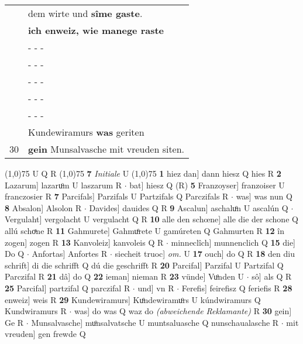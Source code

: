 \documentclass[8pt,a4paper,notitlepage]{article}
\begin{document}
\begin{table}[ht]
\begin{minipage}[t]{0.5\linewidth}
\begin{tabular}{rl}
 & dem wirte und \textbf{sîme gaste}.\\ 
 & \textbf{ich enweiz, wie manege raste}\\ 
 & \multicolumn{1}{l}{ - - - }\\ 
 & \multicolumn{1}{l}{ - - - }\\ 
 & \multicolumn{1}{l}{ - - - }\\ 
 & \multicolumn{1}{l}{ - - - }\\ 
 & \multicolumn{1}{l}{ - - - }\\ 
 & Kundewiramurs \textbf{was} geriten\\ 
30 & \textbf{gein} Munsalvasche mit vreuden siten.\\ 
\end{tabular}
\scriptsize
\line(1,0){75} \newline
U Q R \newline
\line(1,0){75} \newline
\textbf{7} \textit{Initiale} U  \newline
\line(1,0){75} \newline
\textbf{1} hiez dan] dann hiesz Q hies R \textbf{2} Lazarum] lazaruͦm U laszarum R  $\cdot$ bat] hiesz Q (R) \textbf{5} Franzoyser] franzoiser U franczosier R \textbf{7} Parcifals] Parzifals U Partzifals Q Parczifals R  $\cdot$ was] was nun Q \textbf{8} Absalon] Alsolon R  $\cdot$ Davides] dauides Q R \textbf{9} Ascalun] aschaluͦn U ascalún Q  $\cdot$ Vergulaht] vergolacht U vergulacht Q R \textbf{10} alle den schœne] alle die der schone Q allú schoͯne R \textbf{11} Gahmurete] Gahmuͦrete U gamúreten Q Gahmurten R \textbf{12} în zogen] zogen R \textbf{13} Kanvoleiz] kanvoleis Q R  $\cdot$ minneclîch] munnenclich Q \textbf{15} die] Do Q  $\cdot$ Anfortas] Anfortes R  $\cdot$ siecheit truoc] \textit{om.} U \textbf{17} ouch] do Q R \textbf{18} den diu schrift] di die schrifft Q dú die geschrifft R \textbf{20} Parcifal] Parzifal U Partzifal Q Parczifal R \textbf{21} dâ] do Q \textbf{22} ieman] nieman R \textbf{23} vünde] Vuͦnden U  $\cdot$ sô] als Q R \textbf{25} Parcifal] partzifal Q parczifal R  $\cdot$ und] vn R  $\cdot$ Ferefis] feirefisz Q feriefis R \textbf{28} enweiz] weis R \textbf{29} Kundewiramurs] Kuͦndewiramuͦrs U kúndwiramurs Q Kundwiramurs R  $\cdot$ was] do was Q waz do \textit{(abweichende Reklamante)} R \textbf{30} gein] Ge R  $\cdot$ Munsalvasche] muͦnsalvatsche U muntsaluasche Q nunschaualasche R  $\cdot$ mit vreuden] gen frewde Q \newline
\end{minipage}
\end{table}
\end{document}
